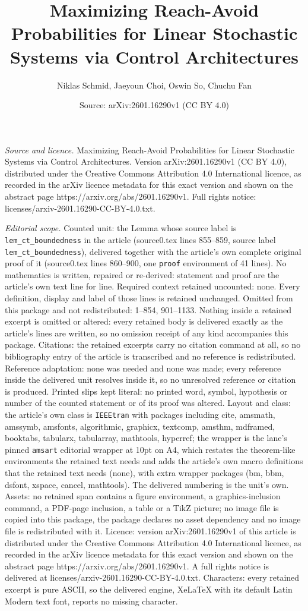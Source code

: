 \documentclass[10pt,a4paper]{amsart}
\title[Maximizing Reach-Avoid Probabilities for Linear Stochastic S]{Maximizing Reach-Avoid Probabilities for Linear Stochastic Systems via Control Architectures}
\author{Niklas Schmid, Jaeyoun Choi, Oswin So, Chuchu Fan}
\date{Source: arXiv:2601.16290v1 (CC BY 4.0)}
\begin{document}
\maketitle

\noindent\emph{Source and licence.} Maximizing Reach-Avoid Probabilities for Linear Stochastic Systems via Control Architectures. Version arXiv:2601.16290v1 (CC BY 4.0), distributed under the Creative Commons Attribution 4.0 International licence, as recorded in the arXiv licence metadata for this exact version and shown on the abstract page https://arxiv.org/abs/2601.16290v1. Full rights notice: licenses/arxiv-2601.16290-CC-BY-4.0.txt.\par\smallskip

\noindent\textit{Editorial scope.} Counted unit: the Lemma whose source label is \texttt{lem\_ct\_boundedness} in the article (source0.tex lines 855--859, source label \texttt{lem\_ct\_boundedness}), delivered together with the article's own complete original proof of it (source0.tex lines 860--900, one \texttt{proof} environment of 41 lines). No mathematics is written, repaired or re-derived: statement and proof are the article's own text line for line. Required context retained uncounted: none. Every definition, display and label of those lines is retained unchanged. Omitted from this package and not redistributed: 1--854, 901--1133. Nothing inside a retained excerpt is omitted or altered: every retained body is delivered exactly as the article's lines are written, so no omission receipt of any kind accompanies this package. Citations: the retained excerpts carry no citation command at all, so no bibliography entry of the article is transcribed and no reference is redistributed. Reference adaptation: none was needed and none was made; every reference inside the delivered unit resolves inside it, so no unresolved reference or citation is produced. Printed slips kept literal: no printed word, symbol, hypothesis or number of the counted statement or of its proof was altered. Layout and class: the article's own class is \texttt{IEEEtran} with packages including cite, amsmath, amssymb, amsfonts, algorithmic, graphicx, textcomp, amsthm, mdframed, booktabs, tabularx, tabularray, mathtools, hyperref; the wrapper is the lane's pinned \texttt{amsart} editorial wrapper at 10pt on A4, which restates the theorem-like environments the retained text needs and adds the article's own macro definitions that the retained text needs (none), with extra wrapper packages (bm, bbm, dsfont, xspace, cancel, mathtools). The delivered numbering is the unit's own. Assets: no retained span contains a figure environment, a graphics-inclusion command, a PDF-page inclusion, a table or a TikZ picture; no image file is copied into this package, the package declares no asset dependency and no image file is redistributed with it. Licence: version arXiv:2601.16290v1 of this article is distributed under the Creative Commons Attribution 4.0 International licence, as recorded in the arXiv licence metadata for this exact version and shown on the abstract page https://arxiv.org/abs/2601.16290v1. A full rights notice is delivered at licenses/arxiv-2601.16290-CC-BY-4.0.txt. Characters: every retained excerpt is pure ASCII, so the delivered engine, XeLaTeX with its default Latin Modern text font, reports no missing character.
\end{document}
